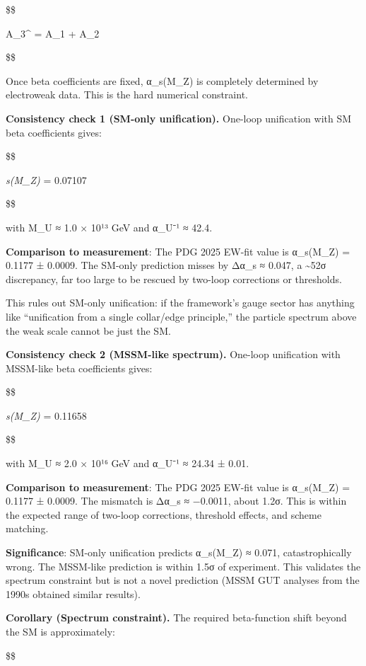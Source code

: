 \documentclass[11pt,a4paper]{article}
\theoremstyle{remark}
\begin{document}
\$\$

A\_3\^{} =  A\_1 +  A\_2

\$\$

Once beta coefficients are fixed, α\_s(M\_Z) is completely determined by
electroweak data. This is the hard numerical constraint.

\textbf{Consistency check 1 (SM-only unification).} One-loop unification with SM beta
coefficients gives:

\$\$

\alpha\emph{s(M\_Z)\textbar{}} = 0.07107 

\$\$

with M\_U ≈ 1.0 × 10¹³ GeV and α\_U⁻¹ ≈ 42.4.

\textbf{Comparison to measurement}: The PDG 2025 EW-fit value is
α\_s(M\_Z) = 0.1177 ± 0.0009. The SM-only prediction misses by
Δα\_s ≈ 0.047, a \textasciitilde52σ discrepancy, far too large to be rescued
by two-loop corrections or thresholds.

This rules out SM-only unification: if the framework's gauge sector has anything
like ``unification from a single collar/edge principle,'' the particle spectrum
above the weak scale cannot be just the SM.

\textbf{Consistency check 2 (MSSM-like spectrum).} One-loop unification with MSSM-like
beta coefficients gives:

\$\$

\alpha\emph{s(M\_Z)\textbar{}} = 0.11658 

\$\$

with M\_U ≈ 2.0 × 10¹⁶ GeV and α\_U⁻¹ ≈ 24.34 ± 0.01.

\textbf{Comparison to measurement}: The PDG 2025 EW-fit value is
α\_s(M\_Z) = 0.1177 ± 0.0009. The mismatch is
Δα\_s ≈ −0.0011, about 1.2σ. This is within the
expected range of two-loop corrections, threshold effects, and scheme
matching.

\textbf{Significance}: SM-only unification predicts α\_s(M\_Z) ≈ 0.071,
catastrophically wrong. The MSSM-like prediction is within 1.5σ of
experiment. This validates the spectrum constraint but is not a novel
prediction (MSSM GUT analyses from the 1990s obtained similar results).

\textbf{Corollary (Spectrum constraint).} The required beta-function shift beyond
the SM is approximately:

\$\$
\end{document}
